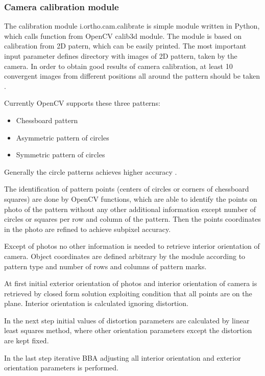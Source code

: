 \documentclass[a4paper,12pt]{article}
\begin{document}
\subsubsection{Camera calibration module}

The calibration module i.ortho.cam.calibrate is simple module written in Python, which calls
function from OpenCV calib3d module. The module is based on calibration from 2D patern, which can 
be easily printed. The most important input parameter defines directory with images of 2D pattern, 
taken by the camera. In order to obtain good results of camera calibration, at least 10 convergent images 
from different positions all around the pattern should be taken \cite{camera_calibration2013opencv}.

Currently OpenCV supports these three patterns:
\begin{itemize}
\item Chessboard pattern 
\item Asymmetric pattern of circles
\item Symmetric pattern of circles
\end{itemize}

Generally the circle patterns achieves higher accuracy \cite{camera_calibration2013opencv}.

The identification of pattern points (centers of circles or corners of chessboard squares) 
are done by OpenCV functions, which are able to identify the points on photo of the pattern 
without any other additional information except number of circles or squares per row and column
of the pattern. Then the points coordinates in the photo are refined to achieve subpixel accuracy.

Except of photos no other information is needed to retrieve interior orientation of camera.
Object coordinates are defined
arbitrary by the module according to pattern type and number of rows and columns of pattern marks.

At first  initial exterior orientation of photos and interior orientation of camera is retrieved 
by closed form solution exploiting condition that all points are on the plane.
Interior orientation is calculated ignoring distortion.

In the next step initial values of distortion parameters are calculated by linear least squares method, 
where other orientation parameters except the distortion are kept fixed.

In the last step iterative BBA adjusting all interior orientation and exterior orientation parameters 
is performed.
\end{document}

